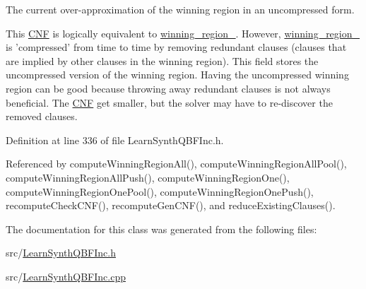 The current over-\/approximation of the winning region in an uncompressed form. 

This \hyperlink{classCNF}{C\-N\-F} is logically equivalent to \hyperlink{classLearnSynthQBFInc_abc3503bdb6be7053a7c3d3d7e57858d6}{winning\-\_\-region\-\_\-}. However, \hyperlink{classLearnSynthQBFInc_abc3503bdb6be7053a7c3d3d7e57858d6}{winning\-\_\-region\-\_\-} is 'compressed' from time to time by removing redundant clauses (clauses that are implied by other clauses in the winning region). This field stores the uncompressed version of the winning region. Having the uncompressed winning region can be good because throwing away redundant clauses is not always beneficial. The \hyperlink{classCNF}{C\-N\-F} get smaller, but the solver may have to re-\/discover the removed clauses. 

Definition at line 336 of file Learn\-Synth\-Q\-B\-F\-Inc.\-h.



Referenced by compute\-Winning\-Region\-All(), compute\-Winning\-Region\-All\-Pool(), compute\-Winning\-Region\-All\-Push(), compute\-Winning\-Region\-One(), compute\-Winning\-Region\-One\-Pool(), compute\-Winning\-Region\-One\-Push(), recompute\-Check\-C\-N\-F(), recompute\-Gen\-C\-N\-F(), and reduce\-Existing\-Clauses().



The documentation for this class was generated from the following files\-:\begin{DoxyCompactItemize}
\item 
src/\hyperlink{LearnSynthQBFInc_8h}{Learn\-Synth\-Q\-B\-F\-Inc.\-h}\item 
src/\hyperlink{LearnSynthQBFInc_8cpp}{Learn\-Synth\-Q\-B\-F\-Inc.\-cpp}\end{DoxyCompactItemize}
